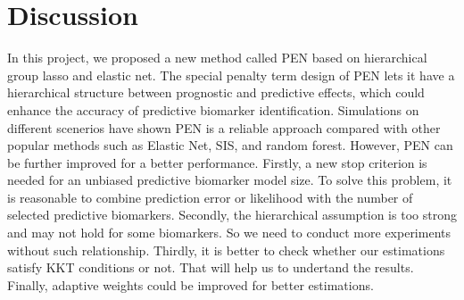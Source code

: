 \documentclass[12pt]{article}
\newcounter{lastnote}
\begin{document}
\section{Discussion}

In this project, we proposed a new method called PEN based on hierarchical group lasso
and elastic net. The special penalty term design of PEN lets it have a hierarchical 
structure between prognostic and predictive effects, which could enhance the accuracy of
predictive biomarker identification. Simulations on different scenerios have shown PEN is
a reliable approach compared with other popular methods such as Elastic Net, SIS, and random forest.
However, PEN can be further improved for a better performance. Firstly, a new stop criterion is needed for
an unbiased predictive biomarker model size. To solve this problem, it is reasonable to combine 
prediction error or likelihood with the number of selected predictive biomarkers. Secondly,
the hierarchical assumption is too strong and may not hold for some biomarkers. So we need to conduct
more experiments without such relationship. Thirdly, it is better to check whether our estimations
satisfy KKT conditions or not. That will help us to undertand the results. Finally, adaptive weights
could be improved for better estimations.




% 















\clearpage
\end{document}
